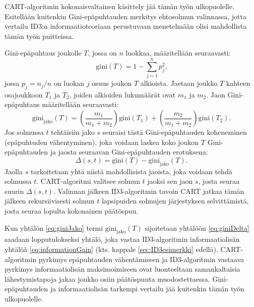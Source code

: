 \documentclass[12pt,finnish]{tktltiki2}
\theoremstyle{definition}
\theoremstyle{remark}
\begin{document}
CART-algoritmin kokonaisvaltainen käsittely jää tämän työn ulkopuolelle. Esitellään kuitenkin
Gini-epäpuhtauden merkitys ehtosolmun valinnassa, jotta vertailu ID3:n
informaatioteoriaan perustuvaan menetelmään olisi mahdollista tämän työn puitteissa.

Gini-epäpuhtaus joukolle $T$, jossa on $n$ luokkaa, määritellään seuraavasti:
\begin{equation*}
\textrm{gini}(T) = 1 -\sum_{j=1}^{n} p_j^2 \mbox{,}
\end{equation*}
jossa $p_j={n_j/n}$ on luokan $j$ osuus joukon $T$ alkioista. Jaetaan joukko $T$ kahteen osajoukkoon
$T_1$ ja $T_2$, joiden alkioiden lukumäärät ovat $m_1$ ja $m_2$. Jaon Gini-epäpuhtaus määritellään seuraavasti:
\begin{equation}
\label{eq:giniJako}
\textrm{gini}_{\textrm{jako}}(T) = \left(\frac{m_1}{m_1+m_2}\right)\textrm{gini}(T_1) + \left(\frac{m_2}{m_1+m_2}\right)\textrm{gini}(T_2) \mbox{.}
\end{equation}
Jos solmussa $t$ tehtäisiin jako $s$ seuraisi tästä Gini-epäpuhtauden koheneminen (epäpuhtuden vähentyminen), joka voidaan
laskea koko joukon $T$ Gini-epäpuhtauden ja jaosta seuraavan Gini-epäpuhtauden erotuksena:
\begin{equation}
\label{eq:giniDelta}
\Delta(s,t) = \textrm{gini}(T) - \textrm{gini}_{\textrm{jako}}(T) \mbox{.}
\end{equation}
Jaolla $s$ tarkoitetaan yhtä niistä mahdollisista jaoista, joka voidaan tehdä solmussa $t$.
CART-algoritmi valitsee solmun $t$ jaoksi sen jaon $s$, josta seuraa suurin $\Delta(s,t)$.
Valinnan jälkeen ID3-algoritmin tavoin CART jatkaa tämän jälkeen rekursiivisesti solmun $t$
lapsipuiden solmujen järjestyksen selvittämistä, josta seuraa lopulta kokonainen päätöspuu.

Kun yhtälön \ref{eq:giniJako} termi ${\textrm{gini}_{\textrm{jako}}(T)}$ sijoitetaan yhtälöön \ref{eq:giniDelta}
saadaan lopputulokseksi yhtälö, joka vastaa ID3-algoritmin informaatiolisän yhtälöä \ref{eq:informationGain} (kts.
kappale \ref{sec:ID3esimerkki} edellä). CART-algoritmin pyrkimys epäpuhtauden vähentämiseen ja ID3-algoritmin
vastaava pyrkimys informaatiolisän maksimoimiseen ovat luonteeltaan samankaltaisia lähestymistapoja jakaa
joukko osiin päätöspuuta muodostettaessa. Gini-epäpuhtauden ja informaatiolisän tarkempi vertailu jää kuitenkin
tämän työn ulkopuolelle.
\end{document}

